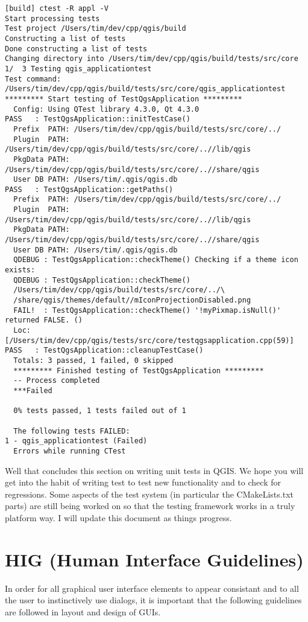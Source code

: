 \begin{verbatim}
[build] ctest -R appl -V
Start processing tests
Test project /Users/tim/dev/cpp/qgis/build
Constructing a list of tests
Done constructing a list of tests
Changing directory into /Users/tim/dev/cpp/qgis/build/tests/src/core
1/  3 Testing qgis_applicationtest          
Test command: /Users/tim/dev/cpp/qgis/build/tests/src/core/qgis_applicationtest
********* Start testing of TestQgsApplication *********
  Config: Using QTest library 4.3.0, Qt 4.3.0
PASS   : TestQgsApplication::initTestCase()
  Prefix  PATH: /Users/tim/dev/cpp/qgis/build/tests/src/core/../
  Plugin  PATH: /Users/tim/dev/cpp/qgis/build/tests/src/core/..//lib/qgis
  PkgData PATH: /Users/tim/dev/cpp/qgis/build/tests/src/core/..//share/qgis
  User DB PATH: /Users/tim/.qgis/qgis.db
PASS   : TestQgsApplication::getPaths()
  Prefix  PATH: /Users/tim/dev/cpp/qgis/build/tests/src/core/../
  Plugin  PATH: /Users/tim/dev/cpp/qgis/build/tests/src/core/..//lib/qgis
  PkgData PATH: /Users/tim/dev/cpp/qgis/build/tests/src/core/..//share/qgis
  User DB PATH: /Users/tim/.qgis/qgis.db
  QDEBUG : TestQgsApplication::checkTheme() Checking if a theme icon exists:
  QDEBUG : TestQgsApplication::checkTheme() 
  /Users/tim/dev/cpp/qgis/build/tests/src/core/../\
  /share/qgis/themes/default//mIconProjectionDisabled.png
  FAIL!  : TestQgsApplication::checkTheme() '!myPixmap.isNull()' returned FALSE. ()
  Loc: [/Users/tim/dev/cpp/qgis/tests/src/core/testqgsapplication.cpp(59)]
PASS   : TestQgsApplication::cleanupTestCase()
  Totals: 3 passed, 1 failed, 0 skipped
  ********* Finished testing of TestQgsApplication *********
  -- Process completed
  ***Failed

  0% tests passed, 1 tests failed out of 1

  The following tests FAILED:
1 - qgis_applicationtest (Failed)
  Errors while running CTest

\end{verbatim}

Well that concludes this section on writing unit tests in QGIS. We hope you 
will get into the habit of writing test to test new functionality and to 
check for regressions. Some aspects of the test system (in particular the 
CMakeLists.txt parts) are still being worked on so that the testing framework 
works in a truly platform way. I will update this document as things progress.


\section{HIG (Human Interface Guidelines)}
In order for all graphical user interface elements to appear consistant and 
to all the user to instinctively use dialogs, it is important that the following 
guidelines are followed in layout and design of GUIs.

